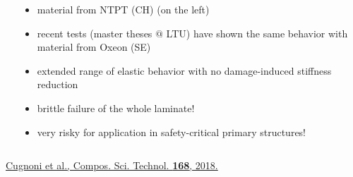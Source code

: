 \documentclass[first,firstsupp,lastsupp,last,hyperref,table]{ETHclass}
\begin{document}
\begin{frame}
\begin{columns}[c]
\begin{column}{0.5\textwidth}
\end{column}
\begin{column}{0.5\textwidth}
\centering
\scriptsize
\begin{itemize}[label=]
\item material from NTPT (CH) (on the left)
\item recent tests (master theses $@$ LTU) have shown the same behavior with material from Oxeon (SE)
\end{itemize}
\begin{itemize}[label=\color{green}]
\item extended range of elastic behavior with no damage-induced stiffness reduction
\end{itemize}
\begin{itemize}[label=\color{red}]
\item brittle failure of the whole laminate!
\item very risky for application in safety-critical primary structures!
\end{itemize}
\end{column}
\end{columns}
\vspace{0.15cm}
\begin{columns}[b]
\begin{column}{0.5\textwidth}
\centering
\pgfmathsetmacro{}
\pgfmathsetmacro{}
{\fontsize{\fontsizeref}{\stretchref} \selectfont \href{https://doi.org/10.1016/j.compscitech.2018.08.037}{Cugnoni et al., Compos. Sci. Technol. \textbf{168}, 2018.}}
\end{column}
\begin{column}{0.5\textwidth}
\
\end{column}
\end{columns}
\end{frame}

\end{document}
